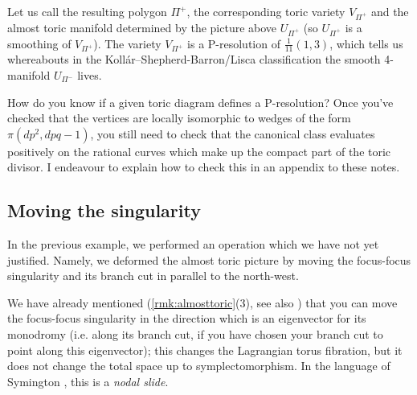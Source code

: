 \documentclass{article}
\begin{document}
\begin{center}
\end{center}
Let us call the resulting polygon \(\Pi^+\), the corresponding toric
variety \(V_{\Pi^+}\) and the almost toric manifold determined by the
picture above \(U_{\Pi^+}\) (so \(U_{\Pi^+}\) is a smoothing of
\(V_{\Pi^+}\)). The variety \(V_{\Pi^+}\) is a P-resolution of
\(\frac{1}{11}(1,3)\), which tells us whereabouts in the
Koll\'{a}r--Shepherd-Barron/Lisca classification the smooth 4-manifold
\(U_{\Pi^-}\) lives.


\begin{Remark}
How do you know if a given toric diagram defines a P-resolution?
Once you've checked that the vertices are locally isomorphic to
wedges of the form \(\pi(dp^2,dpq-1)\), you still need to check that
the canonical class evaluates positively on the rational curves
which make up the compact part of the toric divisor. I endeavour to
explain how to check this in an appendix to these notes.


\end{Remark}
\subsection{Moving the singularity}


In the previous example, we performed an operation which we have not
yet justified. Namely, we deformed the almost toric picture by moving
the focus-focus singularity and its branch cut in parallel to the
north-west.


We have already mentioned (\cref{rmk:almosttoric}(3), see also
{\cite[Proposition 6.2]{Symington}}) that you can move the focus-focus
singularity in the direction which is an eigenvector for its monodromy
(i.e. along its branch cut, if you have chosen your branch cut to
point along this eigenvector); this changes the Lagrangian torus
fibration, but it does not change the total space up to
symplectomorphism. In the language of Symington \cite{Symington}, this
is a {\em nodal slide}.
\end{document}
